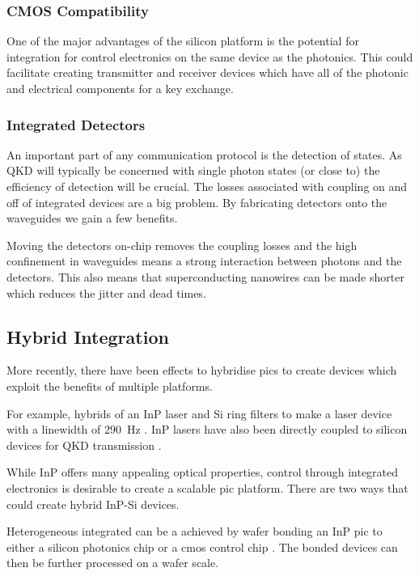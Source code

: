 \subsubsection*{CMOS Compatibility}

One of the major advantages of the silicon platform is the potential for integration for control electronics on the same device as the photonics. This could facilitate creating transmitter and receiver devices which have all of the photonic and electrical components for a key exchange. 

\subsubsection*{Integrated Detectors}

An important part of any communication protocol is the detection of states. As \ac{QKD} will typically be concerned with single photon states (or close to) the efficiency of detection will be crucial. The losses associated with coupling on and off of integrated devices are a big problem. By fabricating detectors onto the waveguides we gain a few benefits.

Moving the detectors on-chip removes the coupling losses and the high confinement in waveguides means a strong interaction between photons and the detectors. This also means that superconducting nanowires can be made shorter which reduces the jitter and dead times.

\subsection{Hybrid Integration}

More recently, there have been effects to hybridise \acp{pic} to create devices which exploit the benefits of multiple platforms. 

For example, hybrids of an \ac{InP} laser and Si ring filters to make a laser device with a linewidth of \SI{290}{Hz} \cite{Fan2017}. \ac{InP} lasers have also been directly coupled to silicon devices for \ac{QKD} transmission \cite{Agnesi2019}.

While \ac{InP} offers many appealing optical properties, control through integrated electronics is desirable to create a scalable \ac{pic} platform. There are two ways that could create hybrid \ac{InP}-Si devices. 

Heterogeneous integrated can be a achieved by wafer bonding an \ac{InP} \ac{pic} to either a silicon photonics chip or a \ac{cmos} control chip \cite{jeppix}. The bonded devices can then be further processed on a wafer scale.


